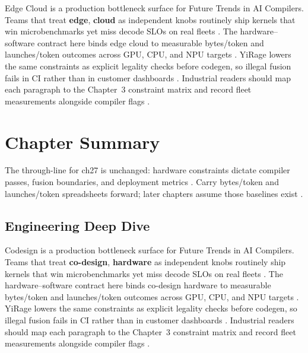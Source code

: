 Edge Cloud is a production bottleneck surface for Future Trends in AI Compilers. Teams that treat \textbf{edge}, \textbf{cloud} as independent knobs routinely ship kernels that win microbenchmarks yet miss decode SLOs on real fleets \citep{nvidia2022hopper,amd2024aie}. The hardware--software contract here binds edge cloud to measurable bytes/token and launches/token outcomes across GPU, CPU, and NPU targets \citep{semianalysis2024tma,dlbook}. YiRage lowers the same constraints as explicit legality checks before codegen, so illegal fusion fails in CI rather than in customer dashboards \citep{amd2024xdna,dao2022flashattention}. Industrial readers should map each paragraph to the Chapter~3 constraint matrix and record fleet measurements alongside compiler flags \citep{amd2024aie,kwon2023vllm}.

\section{Chapter Summary}
\label{sec:ch27_summary}

The through-line for ch27 is unchanged: hardware constraints dictate compiler passes, fusion boundaries, and deployment metrics \citep{memoryfloor2026,amd2024xdna}. Carry bytes/token and launches/token spreadsheets forward; later chapters assume those baselines exist \citep{semianalysis2024tma,dlbook}.


\subsection{Engineering Deep Dive}
\label{sec:ch27_deep_dive}

Codesign is a production bottleneck surface for Future Trends in AI Compilers. Teams that treat \textbf{co-design}, \textbf{hardware} as independent knobs routinely ship kernels that win microbenchmarks yet miss decode SLOs on real fleets \citep{semianalysis2024tma,dlbook}. The hardware--software contract here binds co-design hardware to measurable bytes/token and launches/token outcomes across GPU, CPU, and NPU targets \citep{amd2024xdna,dao2022flashattention}. YiRage lowers the same constraints as explicit legality checks before codegen, so illegal fusion fails in CI rather than in customer dashboards \citep{amd2024aie,kwon2023vllm}. Industrial readers should map each paragraph to the Chapter~3 constraint matrix and record fleet measurements alongside compiler flags \citep{dlbook,nvidia2024cudagraphs}.

